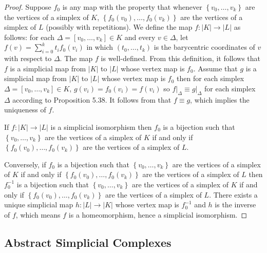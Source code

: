 \begin{proof}
	Suppose \( f_{0} \) is any map with the property that whenever \( \left\{ v_{0}, \ldots, v_{k} \right\} \) are the vertices of a simplex of \( K \), \( \left\{ f_{0}(v_{0}), \ldots, f_{0}(v_{k}) \right\} \) are the vertices of a simplex of \( L \) (possibly with repetitions). We define the map \( f: \left\vert K \right\vert \to \left\vert L \right\vert \) as follows: for each \( \Delta = [v_{0}, \ldots, v_{k}] \in K \) and every \( v \in \Delta \), let \( f(v) = \sum^{k}_{i=0} t_{i} f_{0}(v_{i}) \) in which \( (t_{0}, \ldots, t_{k}) \) is the barycentric coordinates of \( v \) with respect to \( \Delta \). The map \( f \) is well-defined. From this definition, it follows that \( f \) is a simplicial map from \( \left\vert K \right\vert \) to \( \left\vert L \right\vert \) whose vertex map is \( f_{0} \). Assume that \( g \) is a simplicial map from \( \left\vert K \right\vert \) to \( \left\vert L \right\vert \) whose vertex map is \( f_{0} \) then for each simplex \( \Delta = [v_{0}, \ldots, v_{k}] \in K \), \( g(v_{i}) = f_{0}(v_{i}) = f(v_{i}) \) so \( f\vert_{\Delta} \equiv g\vert_{\Delta} \) for each simplex \( \Delta \) according to Proposition 5.38. It follows from that \( f \equiv g \), which implies the uniqueness of \( f \).

	If \( f: \left\vert K \right\vert \to \left\vert L \right\vert \) is a simplicial isomorphism then \( f_{0} \) is a bijection such that \( \left\{ v_{0}, \ldots, v_{k} \right\} \) are the vertices of a simplex of \( K \) if and only if \( \left\{ f_{0}(v_{0}), \ldots, f_{0}(v_{k}) \right\} \) are the vertices of a simplex of \( L \).

	Conversely, if \( f_{0} \) is a bijection such that \( \left\{ v_{0}, \ldots, v_{k} \right\} \) are the vertices of a simplex of \( K \) if and only if \( \left\{ f_{0}(v_{0}), \ldots, f_{0}(v_{k}) \right\} \) are the vertices of a simplex of \( L \) then \( f_{0}^{-1} \) is a bijection such that \( \left\{ v_{0}, \ldots, v_{k} \right\} \) are the vertices of a simplex of \( K \) if and only if \( \left\{ f_{0}(v_{0}), \ldots, f_{0}(v_{k}) \right\} \) are the vertices of a simplex of \( L \). There exists a unique simplicial map \( h: \left\vert L \right\vert \to \left\vert K \right\vert \) whose vertex map is \( f_{0}^{-1} \) and \( h \) is the inverse of \( f \), which means \( f \) is a homeomorphism, hence a simplicial isomorphism.
\end{proof}

\subsection*{Abstract Simplicial Complexes}

